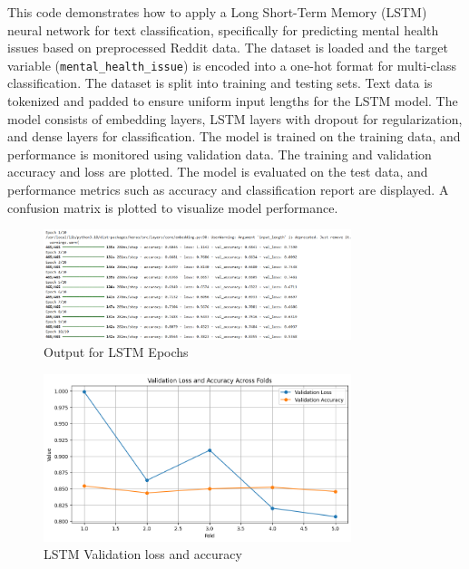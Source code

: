 \noindent
This code demonstrates how to apply a Long Short-Term Memory (LSTM) neural network for text classification, specifically for predicting mental health issues based on preprocessed Reddit data. The dataset is loaded and the target variable (\texttt{mental\_health\_issue}) is encoded into a one-hot format for multi-class classification. The dataset is split into training and testing sets. Text data is tokenized and padded to ensure uniform input lengths for the LSTM model. The model consists of embedding layers, LSTM layers with dropout for regularization, and dense layers for classification. The model is trained on the training data, and performance is monitored using validation data. The training and validation accuracy and loss are plotted. The model is evaluated on the test data, and performance metrics such as accuracy and classification report are displayed. A confusion matrix is plotted to visualize model performance.

\begin{figure}[h!]  
    \centering
    \includegraphics[width=0.8\textwidth]{Images/LSTM Epoch.png}  
    \caption{Output for LSTM Epochs}
    \label{LSTm Epochs}  %
\end{figure}

\begin{figure}[h!]  
    \centering
    \includegraphics[width=0.8\textwidth]{Images/LSTM LA.png}  
    \caption{LSTM Validation loss and accuracy}
    \label{Accuracy Loss}  %
\end{figure}

